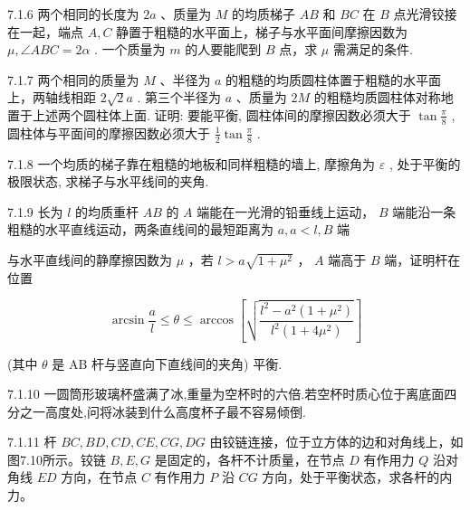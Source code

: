 \begin{problem}{7.1.6}
两个相同的长度为 $2a$ 、质量为 $M$ 的均质梯子 $AB$ 和 $BC$ 在 $B$ 点光滑铰接在一起，端点 $A, C$ 静置于粗糙的水平面上，梯子与水平面间摩擦因数为 $\mu, \angle ABC = 2\alpha$ . 一个质量为 $m$ 的人要能爬到 $B$ 点，求 $\mu$ 需满足的条件.
\end{problem}
\clearpage


\begin{problem}{7.1.7}
两个相同的质量为 $M$ 、半径为 $a$ 的粗糙的均质圆柱体置于粗糙的水平面上，两轴线相距 $2\sqrt{2} a$ . 第三个半径为 $a$ 、质量为 $2M$ 的粗糙均质圆柱体对称地置于上述两个圆柱体上面. 证明: 要能平衡, 圆柱体间的摩擦因数必须大于 $\tan \frac{\pi}{8}$ , 圆柱体与平面间的摩擦因数必须大于 $\frac{1}{2} \tan \frac{\pi}{8}$ .
\end{problem}
\clearpage


\begin{problem}{7.1.8}
一个均质的梯子靠在粗糙的地板和同样粗糙的墙上, 摩擦角为 $\varepsilon$ , 处于平衡的极限状态, 求梯子与水平线间的夹角.
\end{problem}
\clearpage


\begin{problem}{7.1.9}
长为 $l$ 的均质重杆 $AB$ 的 $A$ 端能在一光滑的铅垂线上运动， $B$ 端能沿一条粗糙的水平直线运动，两条直线间的最短距离为 $a, a < l, B$ 端

与水平直线间的静摩擦因数为 $\mu$ ，若 $l > a\sqrt{1 + \mu^2}$ ， $A$ 端高于 $B$ 端，证明杆在位置

\[
\arcsin \frac {a}{l} \leqslant \theta \leqslant \arccos \left[ \sqrt {\frac {l ^ {2} - a ^ {2} (1 + \mu^ {2})}{l ^ {2} (1 + 4 \mu^ {2})}} \right]
\]

(其中 $\theta$ 是 AB 杆与竖直向下直线间的夹角) 平衡.
\begin{center}

\end{center}
\end{problem}
\clearpage


\begin{problem}{7.1.10}
一圆筒形玻璃杯盛满了冰,重量为空杯时的六倍.若空杯时质心位于离底面四分之一高度处,问将冰装到什么高度杯子最不容易倾倒.
\end{problem}
\clearpage


\begin{problem}{7.1.11}
杆 $BC, BD, CD, CE, CG, DG$ 由铰链连接，位于立方体的边和对角线上，如图7.10所示。铰链 $B, E, G$ 是固定的，各杆不计质量，在节点 $D$ 有作用力 $Q$ 沿对角线 $ED$ 方向，在节点 $C$ 有作用力 $P$ 沿 $CG$ 方向，处于平衡状态，求各杆的内力。
\begin{center}

\end{center}
\end{problem}
\clearpage


